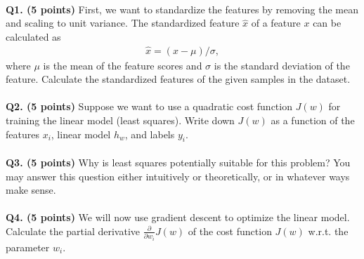 \documentclass[11pt]{article}
\begin{document}
\paragraph{}
\textbf{\hspace{-0.4cm}Q1. (5 points)} First, we want to standardize the features by removing the mean and scaling to unit variance. The standardized feature $\hat{{x}}$ of a feature ${x}$ can be calculated as
\begin{align*}
    \hat{{x}} = ({x} - {\mu}) / {\sigma},
\end{align*}
where ${\mu}$ is the mean of the feature scores and ${\sigma}$ is the standard deviation of the feature. Calculate the standardized features of the given samples in the dataset.

\paragraph{}
\textbf{\hspace{-0.4cm}Q2. (5 points)} Suppose we want to use a quadratic cost function $J(w)$ for training the linear model (least squares). Write down $J(w)$ as a function of the features $x_i$, linear model $h_w$, and labels $y_i$. 

\paragraph{}
\textbf{\hspace{-0.4cm}Q3. (5 points)} Why is least squares potentially suitable for this problem? You may answer this question either intuitively or theoretically, or in whatever ways make sense.

\paragraph{}
\textbf{\hspace{-0.4cm}Q4. (5 points)} We will now use gradient descent to optimize the linear model. Calculate the partial derivative $\frac{\partial}{\partial w_i}J(w)$ of the cost function $J(w)$ w.r.t. the parameter $w_i$.

\end{document}
